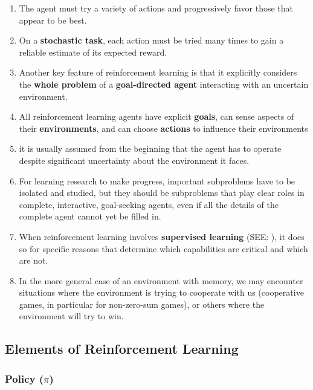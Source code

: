 \begin{enumerate}
    \item The agent must try a variety of actions and progressively favor those that appear to be best. 

    \item On a \textbf{stochastic task}, each action must be tried many times to gain a reliable estimate of its expected reward.

    \item Another key feature of reinforcement learning is that it explicitly considers the \textbf{whole problem} of a \textbf{goal-directed agent} interacting with an uncertain environment.

    \item All reinforcement learning agents have explicit \textbf{goals}, can sense aspects of their \textbf{environments}, and can choose \textbf{actions} to influence their environments

    \item it is usually assumed from the beginning that the agent has to operate despite significant uncertainty about the environment it faces.

    \item  For learning research to make progress, important subproblems have to be isolated and studied, but they should be subproblems that play clear roles in complete, interactive, goal-seeking agents, even if all the details of the complete agent cannot yet be filled in.

    \item When reinforcement learning involves \textbf{supervised learning} (SEE: ), it does so for specific reasons that determine which capabilities are critical and which are not.

    \item In the more general case of an environment with memory, we may encounter situations where the environment is trying to cooperate with us (cooperative games, in particular for non-zero-sum games), or others where the environment will try to win. \cite{dnn-1}

    
\end{enumerate}

\subsection{Elements of Reinforcement Learning \cite{drl-1}}\label{Elements of Reinforcement Learning}

\subsubsection{Policy ($\pi$) \cite{drl-1}}\label{RL: policy}

